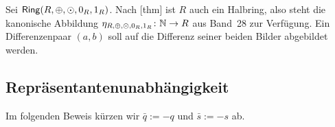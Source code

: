 \documentclass[main.tex]{subfiles}
\begin{document}
Sei \(\mathsf{Ring}\!\left(R,\oplus,\odot,0_R,1_R\right)\). Nach
[thm] ist \(R\) auch ein Halbring,
also steht die kanonische Abbildung
\(\eta_{R,\oplus,\odot,0_R,1_R}\colon\mathbb N\to R\)
aus Band~28 zur Verfügung. Ein Differenzenpaar \((a,b)\) soll auf die
Differenz seiner beiden Bilder abgebildet werden.

\subsection{Repräsentantenunabhängigkeit}

Im folgenden Beweis kürzen wir
\(\bar q:=-q\) und \(\bar s:=-s\) ab.
\end{document}
